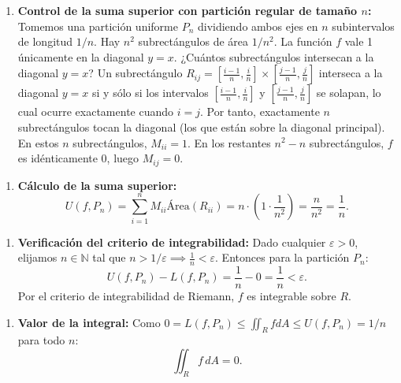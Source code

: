 \documentclass[11pt,a4paper]{article}
\begin{document}
\begin{enumerate}[label=\textbf{\arabic*.}]
\item \textbf{Control de la suma superior con partición regular de tamaño $n$:}
Tomemos una partición uniforme $P_n$ dividiendo ambos ejes en $n$ subintervalos de longitud $1/n$.
Hay $n^2$ subrectángulos de área $1/n^2$.
La función $f$ vale 1 únicamente en la diagonal $y = x$.
¿Cuántos subrectángulos intersecan a la diagonal $y = x$?
Un subrectángulo $R_{ij} = [\frac{i-1}{n}, \frac{i}{n}] \times [\frac{j-1}{n}, \frac{j}{n}]$ interseca a la diagonal $y = x$ si y sólo si los intervalos $[\frac{i-1}{n}, \frac{i}{n}]$ y $[\frac{j-1}{n}, \frac{j}{n}]$ se solapan, lo cual ocurre exactamente cuando $i = j$.
Por tanto, exactamente $n$ subrectángulos tocan la diagonal (los que están sobre la diagonal principal).
En estos $n$ subrectángulos, $M_{ii} = 1$.
En los restantes $n^2 - n$ subrectángulos, $f$ es idénticamente 0, luego $M_{ij} = 0$.
\end{enumerate}

\begin{enumerate}[label=\textbf{\arabic*.}]
\item \textbf{Cálculo de la suma superior:}
\begin{equation*}
U(f, P_n) = \sum_{i=1}^n M_{ii} \text{Área}(R_{ii}) = n \cdot \left(1 \cdot \frac{1}{n^2}\right) = \frac{n}{n^2} = \frac{1}{n}.
\end{equation*}
\end{enumerate}

\begin{enumerate}[label=\textbf{\arabic*.}]
\item \textbf{Verificación del criterio de integrabilidad:}
Dado cualquier $\varepsilon > 0$, elijamos $n \in \mathbb{N}$ tal que $n > 1/\varepsilon \implies \frac{1}{n} < \varepsilon$.
Entonces para la partición $P_n$:
\begin{equation*}
U(f, P_n) - L(f, P_n) = \frac{1}{n} - 0 = \frac{1}{n} < \varepsilon.
\end{equation*}
Por el criterio de integrabilidad de Riemann, $f$ es integrable sobre $R$.
\end{enumerate}

\begin{enumerate}[label=\textbf{\arabic*.}]
\item \textbf{Valor de la integral:}
Como $0 = L(f, P_n) \le \iint_R f dA \le U(f, P_n) = 1/n$ para todo $n$:
\begin{equation*}
\iint_R f \, dA = 0.
\end{equation*}
\end{enumerate}
\end{document}
